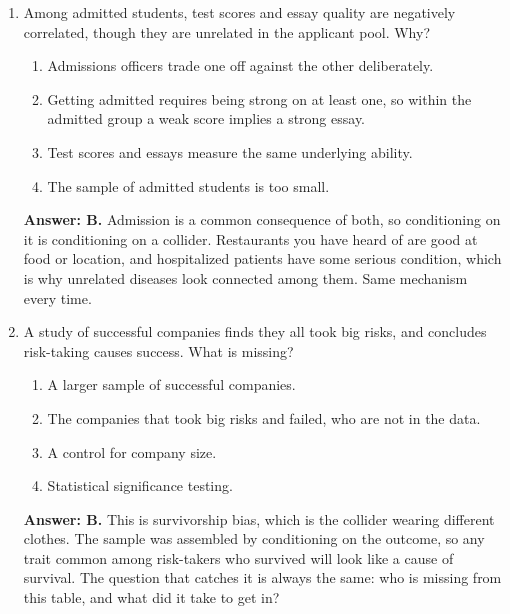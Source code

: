 \documentclass[11pt]{article}
\begin{document}
\begin{enumerate}[itemsep=14pt]
\item Among admitted students, test scores and essay quality are negatively correlated, though they are unrelated in the applicant pool. Why?

\begin{enumerate}[label=\Alph*., itemsep=1pt, topsep=3pt]
  \item Admissions officers trade one off against the other deliberately.
  \item Getting admitted requires being strong on at least one, so within the admitted group a weak score implies a strong essay.
  \item Test scores and essays measure the same underlying ability.
  \item The sample of admitted students is too small.
\end{enumerate}

\vspace{2pt}
\textbf{Answer: B.} Admission is a common consequence of both, so conditioning on it is conditioning on a collider. Restaurants you have heard of are good at food or location, and hospitalized patients have some serious condition, which is why unrelated diseases look connected among them. Same mechanism every time.
\vspace{4pt}

\item A study of successful companies finds they all took big risks, and concludes risk-taking causes success. What is missing?

\begin{enumerate}[label=\Alph*., itemsep=1pt, topsep=3pt]
  \item A larger sample of successful companies.
  \item The companies that took big risks and failed, who are not in the data.
  \item A control for company size.
  \item Statistical significance testing.
\end{enumerate}

\vspace{2pt}
\textbf{Answer: B.} This is survivorship bias, which is the collider wearing different clothes. The sample was assembled by conditioning on the outcome, so any trait common among risk-takers who survived will look like a cause of survival. The question that catches it is always the same: who is missing from this table, and what did it take to get in?
\vspace{4pt}


\end{enumerate}
\end{document}
